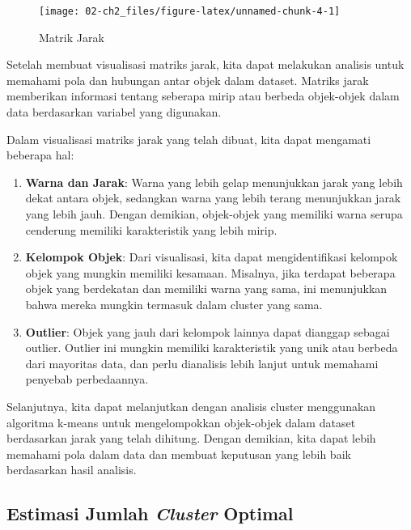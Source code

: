\documentclass[
  oneside]{book}
\begin{document}
\begin{figure}[h]

{\centering \texttt{[image: 02-ch2\_files/figure-latex/unnamed-chunk-4-1]} 

}

\caption{Matrik Jarak}\label{fig:unnamed-chunk-4}
\end{figure}

Setelah membuat visualisasi matriks jarak, kita dapat melakukan analisis untuk memahami pola dan hubungan antar objek dalam dataset. Matriks jarak memberikan informasi tentang seberapa mirip atau berbeda objek-objek dalam data berdasarkan variabel yang digunakan.

Dalam visualisasi matriks jarak yang telah dibuat, kita dapat mengamati beberapa hal:

\begin{enumerate}
\def\labelenumi{\arabic{enumi}.}
\item
  \textbf{Warna dan Jarak}:
  Warna yang lebih gelap menunjukkan jarak yang lebih dekat antara objek, sedangkan warna yang lebih terang menunjukkan jarak yang lebih jauh. Dengan demikian, objek-objek yang memiliki warna serupa cenderung memiliki karakteristik yang lebih mirip.
\item
  \textbf{Kelompok Objek}:
  Dari visualisasi, kita dapat mengidentifikasi kelompok objek yang mungkin memiliki kesamaan. Misalnya, jika terdapat beberapa objek yang berdekatan dan memiliki warna yang sama, ini menunjukkan bahwa mereka mungkin termasuk dalam cluster yang sama.
\item
  \textbf{Outlier}:
  Objek yang jauh dari kelompok lainnya dapat dianggap sebagai outlier. Outlier ini mungkin memiliki karakteristik yang unik atau berbeda dari mayoritas data, dan perlu dianalisis lebih lanjut untuk memahami penyebab perbedaannya.
\end{enumerate}

Selanjutnya, kita dapat melanjutkan dengan analisis cluster menggunakan algoritma k-means untuk mengelompokkan objek-objek dalam dataset berdasarkan jarak yang telah dihitung. Dengan demikian, kita dapat lebih memahami pola dalam data dan membuat keputusan yang lebih baik berdasarkan hasil analisis.

\subsection*{\texorpdfstring{Estimasi Jumlah \emph{Cluster} Optimal}{Estimasi Jumlah Cluster Optimal}}\label{estimasi-jumlah-cluster-optimal}
\end{document}
